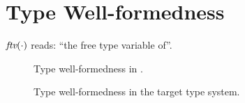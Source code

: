 \section{Type Well-formedness}

$ \ftv \cdot $ reads: ``the free type variable of''.

\begin{figure}[h]
  \framebox{$ \judgeSourceWF \gamma \tau $}

  \begin{mathpar}
  \end{mathpar}
  \caption{Type well-formedness in \name.}
\end{figure}

\begin{figure}[h]

  \begin{mathpar}
  \end{mathpar}
  \caption{Type well-formedness in the target type system.}
\end{figure}
